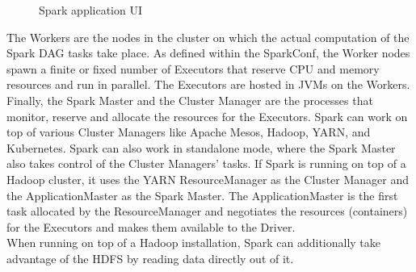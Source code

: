 \begin{figure}[htbp]
	\captionsetup[subfigure]{justification=centering}
	\centering
	\caption{Spark application UI}
	\label{appui}
\end{figure}
\FloatBarrier

\noindent The Workers are the nodes in the cluster on which the actual computation of the Spark DAG tasks take place. As defined within the SparkConf, the Worker nodes spawn a finite or fixed number of Executors that reserve CPU and memory resources and run in parallel. The Executors are hosted in JVMs on the Workers. Finally, the Spark Master and the Cluster Manager are the processes that monitor, reserve and allocate the resources for the Executors. Spark can work on top of various Cluster Managers like Apache Mesos, Hadoop, YARN, and Kubernetes. Spark can also work in standalone mode, where the Spark Master also takes control of the Cluster Managers' tasks. If Spark is running on top of a Hadoop cluster, it uses the YARN ResourceManager as the Cluster Manager and the ApplicationMaster as the Spark Master. The ApplicationMaster is the first task allocated by the ResourceManager and negotiates the resources (containers) for the Executors and makes them available to the Driver.~\cite[pp. 49 ff]{sparkbook1}\\
When running on top of a Hadoop installation, Spark can additionally take advantage of the HDFS by reading data directly out of it.\\

